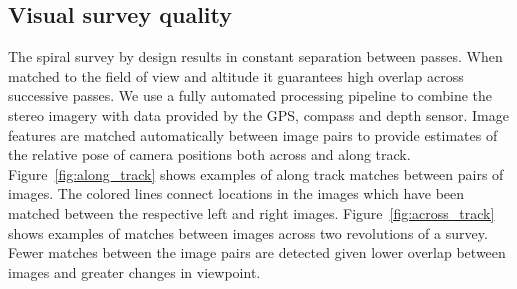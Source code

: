 \subsection{Visual survey quality}
The spiral survey by design results in constant separation between passes. When matched to the field of view and altitude it guarantees high overlap across successive passes. We use a fully automated processing pipeline to combine the stereo imagery with data provided by the GPS, compass and depth sensor.  Image features are matched automatically between image pairs to provide estimates of the relative pose of camera positions both across and along track.  Figure~\ref{fig:along_track} shows examples of along track matches between pairs of images.  The colored lines connect locations in the images which have been matched between the respective left and right images.  Figure~\ref{fig:across_track} shows examples of matches between images across two revolutions of a survey. Fewer matches between the image pairs are detected given lower overlap between images and greater changes in viewpoint.




    
  
  